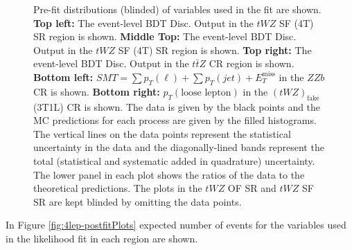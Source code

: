 \begin{figure}[htbp]
        \caption{Pre-fit distributions (blinded) of variables used in the fit are shown. \textbf{Top left:} The event-level BDT Disc. Output in the $tWZ$ SF (4T) SR region is shown. \textbf{Middle Top:} The event-level BDT Disc. Output in the $tWZ$ SF (4T) SR region is shown. \textbf{Top right:} The event-level BDT Disc. Output in the $t\bar{t}Z$ CR region is shown. \textbf{Bottom left:} $SMT = \sum p_{T} (\ell) + \sum p_{T} (jet) + E_{T}^{\text{miss}}$ in the $ZZb$ CR is shown. \textbf{Bottom right:} $p_{T}(\text{loose lepton})$ in the $(tWZ)_{\text{fake}}$ (3T1L) CR is shown. The data is given by the black points and the MC predictions for each process are given by the filled histograms. The vertical lines on the data points represent the statistical uncertainty in the data and the diagonally-lined bands represent the total (statistical and systematic added in quadrature) uncertainty. The lower panel in each plot shows the ratios of the data to the theoretical predictions. The plots in the $tWZ$ OF SR and $tWZ$ SF SR are kept blinded by omitting the data points.}
  \label{fig:4lep-prefitPlots}
\end{figure}


In Figure \ref{fig:4lep-postfitPlots} expected number of events for the variables used in the likelihood fit in each region are shown.

